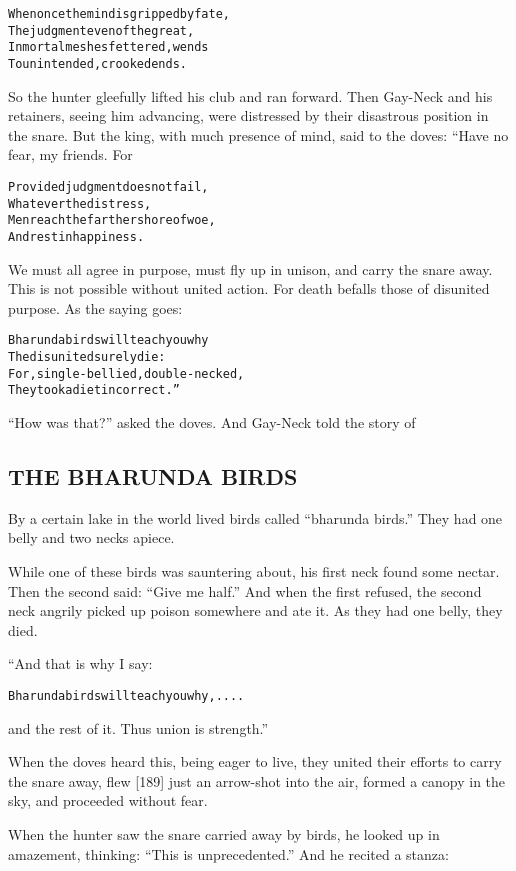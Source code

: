 \documentclass{article}
\renewenvironment{verbatim}{\begin{alltt}\normalfont\begin{centering}}{\end{centering}\end{alltt}}
\begin{document}
\begin{verbatim}
When once the mind is gripped by fate,
The judgment even of the great,
In mortal meshes fettered, wends
To unintended, crooked ends.
\end{verbatim}
So the hunter gleefully lifted his club and ran forward. Then
Gay-Neck and his retainers, seeing him advancing, were distressed
by their disastrous position in the snare. But the king, with much
presence of mind, said to the doves: “Have no fear, my friends.
For

\begin{verbatim}
Provided judgment does not fail,
    Whatever the distress,
Men reach the farther shore of woe,
    And rest in happiness.
\end{verbatim}
We must all agree in purpose, must fly up in unison, and carry the
snare away. This is not possible without united action. For death
befalls those of disunited purpose. As the saying goes:

\begin{verbatim}
Bharunda birds will teach you why
The disunited surely die:
For, single-bellied, double-necked,
They took a diet incorrect.”
\end{verbatim}
``How was that?'' asked the doves. And Gay-Neck told the story of

\subsection{THE BHARUNDA BIRDS}

By a certain lake in the world lived birds called
``bharunda birds.'' They had one belly and two necks apiece.

While one of these birds was sauntering about, his first neck found
some nectar. Then the second said: ``Give me half.'' And when the
first refused, the second neck angrily picked up poison somewhere
and ate it. As they had one belly, they died.

“And that is why I say:

\begin{verbatim}
    Bharunda birds will teach you why, ....
\end{verbatim}
and the rest of it. Thus union is strength.”

When the doves heard this, being eager to live, they united their
efforts to carry the snare away, flew [189] just an arrow-shot into
the air, formed a canopy in the sky, and proceeded without fear.

When the hunter saw the snare carried away by birds, he looked up
in amazement, thinking: ``This is unprecedented.'' And he recited a
stanza:
\end{document}
